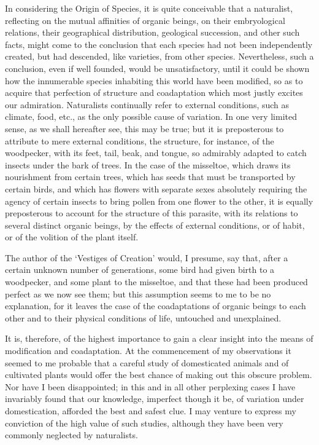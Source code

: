 \documentclass{book}
\begin{document}
In considering the Origin of Species, it is quite conceivable that a
naturalist, reflecting on the mutual affinities of organic beings, on their
embryological relations, their geographical distribution, geological
succession, and other such facts, might come to the conclusion that each
species had not been independently created, but had descended, like varieties,
from other species. Nevertheless, such a conclusion, even if well founded,
would be unsatisfactory, until it could be shown how the innumerable species
inhabiting this world have been modified, so as to acquire that perfection of
structure and coadaptation which most justly excites our admiration.
Naturalists continually refer to external conditions, such as climate, food,
etc., as the only possible cause of variation. In one very limited sense, as we
shall hereafter see, this may be true; but it is preposterous to attribute to
mere external conditions, the structure, for instance, of the woodpecker, with
its feet, tail, beak, and tongue, so admirably adapted to catch insects under
the bark of trees. In the case of the misseltoe, which draws its nourishment
from certain trees, which has seeds that must be transported by certain birds,
and which has flowers with separate sexes absolutely requiring the agency of
certain insects to bring pollen from one flower to the other, it is equally
preposterous to account for the structure of this parasite, with its relations
to several distinct organic beings, by the effects of external conditions, or
of habit, or of the volition of the plant itself.

The author of the `Vestiges of Creation' would, I presume, say
that, after a certain unknown number of
generations, some bird had given birth to a woodpecker, and some plant to the
misseltoe, and that these had been produced perfect as we now see them; but
this assumption seems to me to be no explanation, for it leaves the case of the
coadaptations of organic beings to each other and to their physical conditions
of life, untouched and unexplained.

It is, therefore, of the highest importance to gain a clear insight into the
means of modification and coadaptation. At the commencement of my observations
it seemed to me probable that a careful study of domesticated animals and of
cultivated plants would offer the best chance of making out this obscure
problem. Nor have I been disappointed; in this and in all other perplexing
cases I have invariably found that our knowledge, imperfect though it be, of
variation under domestication, afforded the best and safest clue. I may venture
to express my conviction of the high value of such studies, although they have
been very commonly neglected by naturalists.
\end{document}
